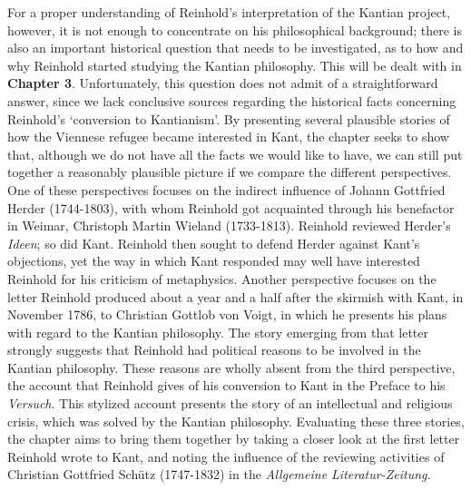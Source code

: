 For a proper understanding of Reinhold's interpretation of the Kantian project, however, it is not enough to concentrate on his philosophical background; there is also an important historical question that needs to be investigated, as to how and why Reinhold started studying the Kantian philosophy. This will be dealt with in \textbf{Chapter 3}. Unfortunately, this question does not admit of a straightforward answer, since we lack conclusive sources regarding the historical facts concerning Reinhold's `conversion to Kantianism'. By presenting several plausible stories of how the Viennese refugee became interested in Kant, the chapter seeks to show that, although we do not have all the facts we would like to have, we can still put together a reasonably plausible picture if we compare the different perspectives. One of these perspectives focuses on the indirect influence of Johann Gottfried Herder (1744{-}1803), with whom Reinhold got acquainted through his benefactor in Weimar, Christoph Martin Wieland (1733{-}1813). Reinhold reviewed Herder's \textit{Ideen}; so did Kant. Reinhold then sought to defend Herder against Kant's objections, yet the way in which Kant responded may well have interested Reinhold for his criticism of metaphysics. Another perspective focuses on the letter Reinhold produced about a year and a half after the skirmish with Kant, in November 1786, to Christian Gottlob von Voigt, in which he presents his plans with regard to the Kantian philosophy. The story emerging from that letter strongly suggests that Reinhold had political reasons to be involved in the Kantian philosophy. These reasons are wholly absent from the third perspective, the account that Reinhold gives of his conversion to Kant in the Preface to his \textit{Versuch}. This stylized account presents the story of an intellectual and religious crisis, which was solved by the Kantian philosophy. Evaluating these three stories, the chapter aims to bring them together by taking a closer look at the first letter Reinhold wrote to Kant, and noting the influence of the reviewing activities of Christian Gottfried Sch\"{u}tz (1747{-}1832) in the \textit{Allgemeine Literatur{-}Zeitung.}

